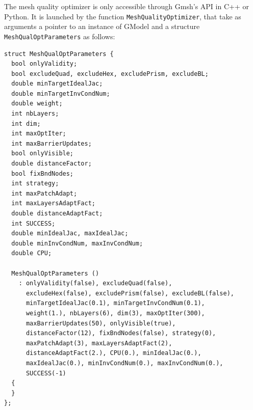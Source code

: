 \documentclass[12pt,a4paper,a4wide]{article}
\begin{document}
The mesh quality optimizer is only accessible through Gmsh's API
in C++ or Python. It is launched by the function
\texttt{MeshQualityOptimizer}, that take as arguments a pointer to
an instance of GModel and a structure \texttt{MeshQualOptParameters}
as follows:
\begin{verbatim}
struct MeshQualOptParameters {
  bool onlyValidity;
  bool excludeQuad, excludeHex, excludePrism, excludeBL;
  double minTargetIdealJac;
  double minTargetInvCondNum;
  double weight;
  int nbLayers;
  int dim;
  int maxOptIter;
  int maxBarrierUpdates;
  bool onlyVisible;
  double distanceFactor;
  bool fixBndNodes;
  int strategy;
  int maxPatchAdapt;
  int maxLayersAdaptFact;
  double distanceAdaptFact;
  int SUCCESS;
  double minIdealJac, maxIdealJac;
  double minInvCondNum, maxInvCondNum;
  double CPU;

  MeshQualOptParameters ()
    : onlyValidity(false), excludeQuad(false),
      excludeHex(false), excludePrism(false), excludeBL(false),
      minTargetIdealJac(0.1), minTargetInvCondNum(0.1),
      weight(1.), nbLayers(6), dim(3), maxOptIter(300),
      maxBarrierUpdates(50), onlyVisible(true),
      distanceFactor(12), fixBndNodes(false), strategy(0),
      maxPatchAdapt(3), maxLayersAdaptFact(2),
      distanceAdaptFact(2.), CPU(0.), minIdealJac(0.),
      maxIdealJac(0.), minInvCondNum(0.), maxInvCondNum(0.),
      SUCCESS(-1)
  {
  }
};
\end{verbatim}
\end{document}
